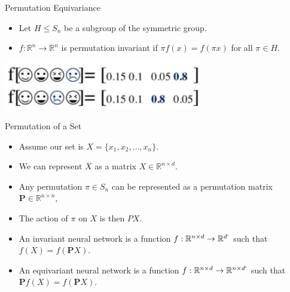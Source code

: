 \documentclass{beamer}
\begin{document}
\begin{frame}{Permutation Equivariance}

    \begin{itemize}
        \setlength{\itemsep}{\fill}
        \item Let $H \leq S_n$ be a subgroup of the symmetric group.
        \pause
        \item $f:\mathbb{R}^n \rightarrow \mathbb{R}^n$ is permutation invariant if $\pi f(x) = f(\pi x)$ for all $\pi \in H$.
    \end{itemize}
    \begin{center}
        \pause
        \includegraphics[width=0.65\textwidth]{../figures/perm_eq.png}
    \end{center}
    
\end{frame}



\begin{frame}{Permutation of a Set}

    \begin{itemize}
        \setlength{\itemsep}{\fill}
        \item Assume our set is $X = \{x_1, x_2, \ldots, x_n\}$.
        \pause
        \item We can represent $X$ as a matrix $X \in \mathbb{R}^{n \times d}$.
        \pause
        \item Any permutation $\pi \in S_n$ can be represented as a permutation matrix $\boldsymbol{P} \in \mathbb{R}^{n \times n}$,
        \pause
        \item The action of $\pi$ on $X$ is then $P X$.
        \pause
        \item An invariant neural network is a function $f: \mathbb{R}^{n \times d} \rightarrow \mathbb{R}^{d`}$ such that $f(X) = f(\boldsymbol{P}X)$.
        \pause
        \item An equivariant neural network is a function $f: \mathbb{R}^{n \times d} \rightarrow \mathbb{R}^{n \times d`}$ such that $\boldsymbol{P}f(X) = f(\boldsymbol{P}X)$.
    \end{itemize}
    
\end{frame}
\end{document}
